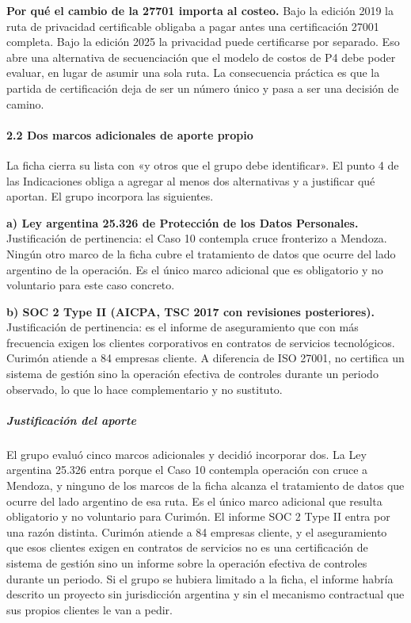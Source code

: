 \textbf{Por qué el cambio de la 27701 importa al costeo.} Bajo la edición 2019 la ruta de privacidad certificable obligaba a pagar antes una certificación 27001 completa. Bajo la edición 2025 la privacidad puede certificarse por separado. Eso abre una alternativa de secuenciación que el modelo de costos de P4 debe poder evaluar, en lugar de asumir una sola ruta. La consecuencia práctica es que la partida de certificación deja de ser un número único y pasa a ser una decisión de camino.

\paragraph{2.2 Dos marcos adicionales de aporte propio}\label{dos-marcos-adicionales-de-aporte-propio}

La ficha cierra su lista con «y otros que el grupo debe identificar». El punto 4 de las Indicaciones obliga a agregar al menos dos alternativas y a justificar qué aportan. El grupo incorpora las siguientes.

\textbf{a) Ley argentina 25.326 de Protección de los Datos Personales.} Justificación de pertinencia: el Caso 10 contempla cruce fronterizo a Mendoza. Ningún otro marco de la ficha cubre el tratamiento de datos que ocurre del lado argentino de la operación. Es el único marco adicional que es obligatorio y no voluntario para este caso concreto.

\textbf{b) SOC 2 Type II (AICPA, TSC 2017 con revisiones posteriores).} Justificación de pertinencia: es el informe de aseguramiento que con más frecuencia exigen los clientes corporativos en contratos de servicios tecnológicos. Curimón atiende a 84 empresas cliente. A diferencia de ISO 27001, no certifica un sistema de gestión sino la operación efectiva de controles durante un periodo observado, lo que lo hace complementario y no sustituto.

\subparagraph{Justificación del aporte}\label{justificaciuxf3n-del-aporte}

El grupo evaluó cinco marcos adicionales y decidió incorporar dos. La Ley argentina 25.326 entra porque el Caso 10 contempla operación con cruce a Mendoza, y ninguno de los marcos de la ficha alcanza el tratamiento de datos que ocurre del lado argentino de esa ruta. Es el único marco adicional que resulta obligatorio y no voluntario para Curimón. El informe SOC 2 Type II entra por una razón distinta. Curimón atiende a 84 empresas cliente, y el aseguramiento que esos clientes exigen en contratos de servicios no es una certificación de sistema de gestión sino un informe sobre la operación efectiva de controles durante un periodo. Si el grupo se hubiera limitado a la ficha, el informe habría descrito un proyecto sin jurisdicción argentina y sin el mecanismo contractual que sus propios clientes le van a pedir.

